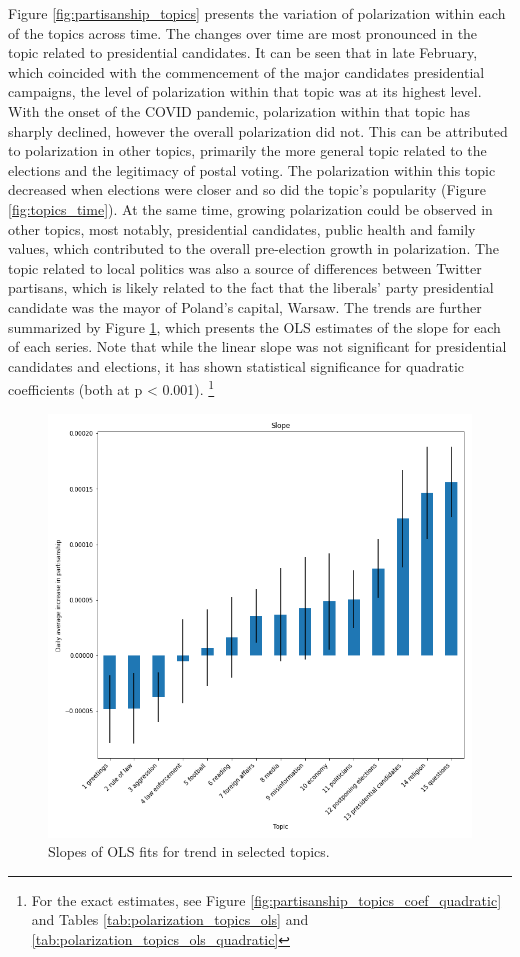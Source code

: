 \documentclass{article}
\begin{document}
	Figure \ref{fig:partisanship_topics} presents the variation of polarization within each of the topics across time. The changes over time are most pronounced in the topic related to presidential candidates. It can be seen that in late February, which coincided with the commencement of the major candidates presidential campaigns, the level of polarization within that topic was at its highest level. With the onset of the COVID pandemic, polarization within that topic has sharply declined, however the overall polarization did not. This can be attributed to polarization in other topics, primarily the more general topic related to the elections and the legitimacy of postal voting. The polarization within this topic decreased when elections were closer and so did the topic’s popularity (Figure \ref{fig:topics_time}). At the same time, growing polarization could be observed in other topics, most notably, presidential candidates, public health and family values, which contributed to the overall pre-election growth in polarization. The topic related to local politics was also a source of differences between Twitter partisans, which is likely related to the fact that the liberals’ party presidential candidate was the mayor of Poland’s capital, Warsaw. The trends are further summarized by Figure \ref{fig:partisanship_topics_coef}, which presents the OLS estimates of the slope for each of each series. Note that while the linear slope was not significant for presidential candidates and elections, it has shown statistical significance for quadratic coefficients (both at p < 0.001). \footnote{For the exact estimates, see Figure \ref{fig:partisanship_topics_coef_quadratic} and Tables \ref{tab:polarization_topics_ols} and \ref{tab:polarization_topics_ols_quadratic}}
	
	\begin{figure}[!h]
		\includegraphics[width=\columnwidth]{figures/partisanship_topics_coef}
		\caption{Slopes of OLS fits for trend in selected topics.}
		\label{fig:partisanship_topics_coef}
	\end{figure}
\end{document}
